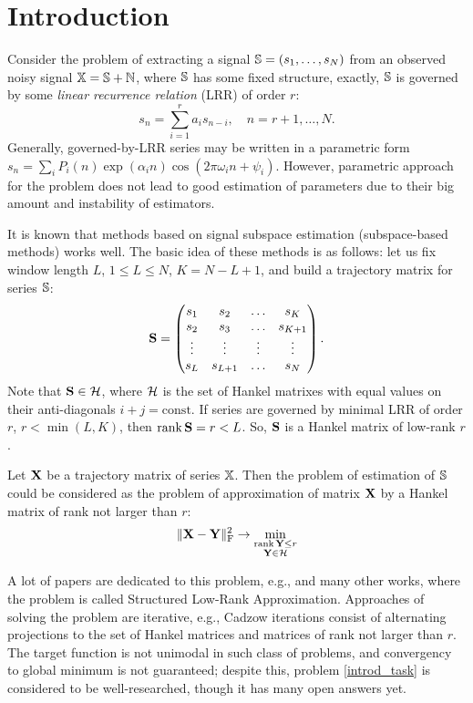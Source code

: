 \documentclass[12pt,a4paper,fleqn,leqno]{article}
\def\rank{\mathop{\mathrm{rank}}}
\begin{document}
\section{Introduction}
Consider the problem of extracting a signal $\mathbb{S} = (s_1, \ldots, s_N)$ from an observed noisy signal $\mathbb{X} = \mathbb{S} + \mathbb{N}$, where $\mathbb{S}$ has some fixed structure, exactly, $\mathbb{S}$ is governed by some \emph{linear recurrence relation} (LRR) of order $r$:
\begin{equation*}
s_n = \sum_{i = 1}^{r} a_i s_{n-i}, \quad n = r + 1, \ldots, N.
\end{equation*}
Generally, governed-by-LRR series may be written in a parametric form \\ $s_n = \sum_i P_i(n) \exp(\alpha_i n) \cos(2 \pi \omega_i n + \psi_i)$. However, parametric approach for the problem does not lead to good estimation of parameters due to their big amount and instability of estimators.

It is known that methods based on signal subspace estimation (subspace-based methods) works well. The basic idea of these methods is as follows: let us fix window length $L$, $1 \le L \le N$, $K = N - L + 1$, and build a trajectory matrix for series $\mathbb{S}$:
\begin{equation*}
\mathbf{S} = \begin{pmatrix}
s_1 & s_2 & \ldots & s_K \\
s_2 & s_3 & \ldots & s_{K + 1} \\
\vdots & \vdots & \vdots & \vdots \\
s_L & s_{L + 1} & \ldots & s_N
\end{pmatrix}.
\end{equation*}
Note that $\mathbf{S}\in \mathcal{H}$, where $\mathcal{H}$ is the set of Hankel matrixes with equal values on their anti-diagonals $i+j=\mathrm{const}$.
If series are governed by minimal LRR of order $r$, $r < \min(L, K)$, then $\rank \bfS = r < L$. So, $\mathbf{S}$ is a Hankel matrix of low-rank $r$.

Let $\mathbf{X}$ be a trajectory matrix of series $\mathbb{X}$. Then the problem of estimation of $\mathbb{S}$ could be considered as the problem of approximation of matrix $\mathbf{X}$ by a Hankel matrix of rank not larger than $r$:
\begin{equation}\label{introd_task}
\|\bfX - \bfY\|^2_\rmF \to \min_{\substack{\rank \bfY \le r \\ \bfY \in \calH}}
\end{equation}

A lot of papers are dedicated to this problem, e.g., \cite{Cadzow1988, Markovsky2011, Usevich.Markovsky2014, Gillard.Zhigljavsky2013} and many other works, where the problem is called Structured Low-Rank Approximation. Approaches of solving the problem are iterative, e.g., Cadzow iterations consist of alternating projections to the set of Hankel matrices and matrices of rank not larger than $r$. The target function is not unimodal in such class of problems, and convergency to global minimum is not guaranteed; despite this, problem \eqref{introd_task} is considered to be well-researched, though it has many open answers yet.
\end{document}
